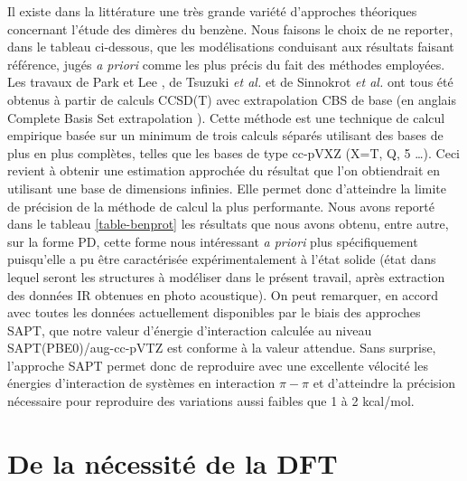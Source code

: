 	Il existe dans la littérature une très grande variété d’approches théoriques concernant l’étude des dimères du benzène. Nous faisons le choix de ne reporter, dans le tableau ci-dessous, que les modélisations conduisant aux résultats faisant référence, jugés \textit{a priori} comme les plus précis du fait des méthodes employées. Les travaux de Park et Lee \cite{park2006accurate}, de Tsuzuki \textit{et al.} \cite{tsuzuki2002origin} et de Sinnokrot \textit{et al.} \cite{hobza1996potential} ont tous été obtenus à partir de calculs CCSD(T) avec extrapolation CBS de base (en anglais \og Complete Basis Set extrapolation \fg). Cette méthode est une technique de calcul empirique basée sur un minimum de trois calculs séparés utilisant des bases de plus en plus complètes, telles que les bases de type cc-pVXZ (X=T, Q, 5 …). Ceci revient à obtenir une estimation approchée du résultat que l'on obtiendrait en utilisant une base de dimensions infinies. Elle permet donc d’atteindre la limite de précision de la méthode de calcul la plus performante. Nous avons reporté dans le tableau \ref{table-benprot} les résultats que nous avons obtenu, entre autre, sur la forme PD, cette forme nous intéressant \textit{a priori} plus spécifiquement puisqu'elle a pu être caractérisée expérimentalement à l'état solide (état dans lequel seront les structures à modéliser dans le présent travail, après extraction des données IR obtenues en photo acoustique). On peut remarquer, en accord avec toutes les données actuellement disponibles par le biais des approches SAPT, que notre valeur d’énergie d’interaction calculée au niveau SAPT(PBE0)/aug-cc-pVTZ est conforme à la valeur attendue. Sans surprise, l’approche SAPT permet donc de reproduire avec une excellente vélocité les énergies d’interaction de systèmes en interaction $\pi-\pi$ et d’atteindre la précision nécessaire pour reproduire des variations aussi faibles que 1 à 2 kcal/mol.
	

	
	
	
	
	
	
	\newpage
	\section{De la nécessité de la DFT}
	
